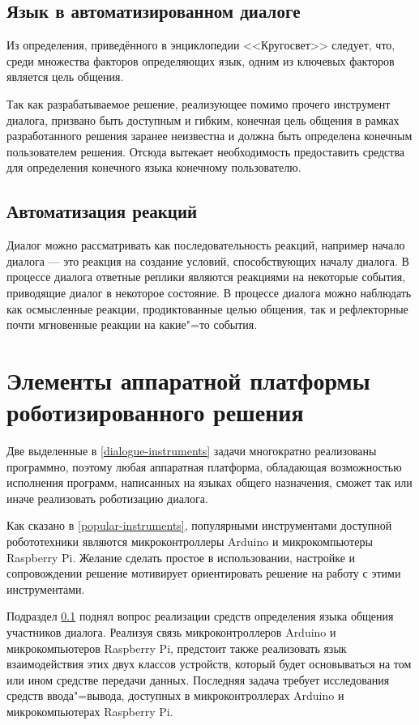 \subsection{Язык в автоматизированном диалоге}\label{language-auto}
Из определения, приведённого в энциклопедии <<Кругосвет>> \cite{lang-krugosvet} следует, что, среди множества факторов определяющих язык, одним из ключевых факторов является цель общения. 

Так как разрабатываемое решение, реализующее помимо прочего инструмент диалога, призвано быть доступным и гибким, конечная цель общения в рамках разработанного решения заранее неизвестна и должна быть определена конечным пользователем решения. Отсюда вытекает необходимость предоставить средства для определения конечного языка конечному пользователю. 





\subsection{Автоматизация реакций}
Диалог можно рассматривать как последовательность реакций, например начало диалога --- это реакция на создание условий, способствующих началу диалога. В процессе диалога ответные реплики являются реакциями на некоторые события, приводящие диалог в некоторое состояние. В процессе диалога можно наблюдать как осмысленные реакции, продиктованные целью общения, так и рефлекторные почти мгновенные реакции на какие"=то события.



\section{Элементы аппаратной платформы роботизированного решения}

Две выделенные в \ref{dialogue-instruments} задачи многократно реализованы программно, поэтому любая аппаратная платформа, обладающая возможностью исполнения программ, написанных на языках общего назначения, сможет так или иначе реализовать роботизацию диалога.  

Как сказано в \ref{popular-instruments}, популярными инструментами доступной робототехники являются микроконтроллеры Arduino и микрокомпьютеры Raspberry Pi. Желание сделать простое в использовании, настройке и сопровождении решение мотивирует ориентировать решение на работу с этими инструментами. 


Подраздел \ref{language-auto} поднял вопрос реализации средств определения языка общения участников диалога. Реализуя связь микроконтроллеров
Arduino и микрокомпьютеров Raspberry Pi, предстоит также реализовать язык взаимодействия этих двух классов устройств, который будет основываться на том или ином средстве передачи данных. Последняя задача требует исследования средств ввода"=вывода, доступных в микроконтроллерах Arduino и микрокомпьютерах Raspberry Pi.

